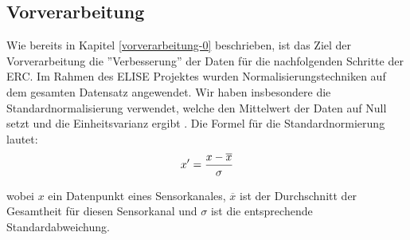 \subsection{Vorverarbeitung} \label{vorverarbeitung-1}

Wie bereits in Kapitel \ref{vorverarbeitung-0} beschrieben, ist das Ziel der Vorverarbeitung die ”Verbesserung” der Daten für die nachfolgenden Schritte der ERC.
Im Rahmen des ELISE Projektes wurden Normalisierungstechniken auf dem gesamten Datensatz angewendet. 
Wir haben insbesondere die Standardnormalisierung verwendet, welche den Mittelwert der Daten auf Null setzt und die Einheitsvarianz ergibt \cite{grus15}. 
Die Formel für die Standardnormierung lautet:
\begin{equation} 
\Large{ {x'={\frac {x-{\overline {x}}}{\sigma }}} } 
\label{equ:norm} \end{equation} %

wobei $ x $ ein Datenpunkt eines Sensorkanales, $ \overline{x} $ ist der Durchschnitt der Gesamtheit für diesen Sensorkanal und $ \sigma $ ist die entsprechende Standardabweichung. \\